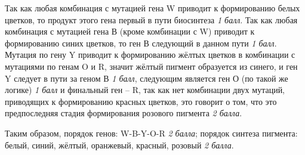 \solutionSection

Так как любая комбинация с мутацией гена W приводит к формированию белых цветков, то продукт этого гена 
первый в пути биосинтеза \textit{1 балл}. Так как любая комбинация с мутацией гена В (кроме комбинации с W) приводит 
к формированию синих цветков, то ген В следующий в данном пути \textit{1 балл}. Мутация по гену Y приводит к 
формированию жёлтых цветков в комбинации с мутациями по генам O и R, значит жёлтый пигмент образуется 
из синего, и ген Y следует в пути за геном В \textit{1 балл}, следующим является ген О (по такой же логике) \textit{1 балл} и 
финальный ген – R, так как нет комбинации двух мутаций, приводящих к формированию красных цветков, это говорит 
о том, что это предпоследняя стадия формирования розового пигмента \textit{2 балла}. 

Таким образом, порядок генов: W-B-Y-O-R \textit{2 балла}; порядок синтеза пигмента: белый, синий, жёлтый, оранжевый, 
красный, розовый \textit{2 балла}.
